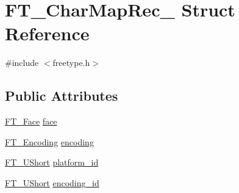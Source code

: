 \hypertarget{struct_f_t___char_map_rec__}{\section{F\-T\-\_\-\-Char\-Map\-Rec\-\_\- Struct Reference}
\label{struct_f_t___char_map_rec__}
}


{\ttfamily \#include $<$freetype.\-h$>$}

\subsection*{Public Attributes}
\begin{DoxyCompactItemize}
\item 
\hyperlink{freetype_8h_a7eba045ee20968354fa1bff0f69740fa}{F\-T\-\_\-\-Face} \hyperlink{struct_f_t___char_map_rec___a70a4e53e3f9818209916e5745c46dc28}{face}
\item 
\hyperlink{freetype_8h_a2c7f8d9834bb770d792cd8e0079f6835}{F\-T\-\_\-\-Encoding} \hyperlink{struct_f_t___char_map_rec___a88ee6f726ef11a8e6cc793d59ff5557e}{encoding}
\item 
\hyperlink{fttypes_8h_a937f6c17cf5ffd09086d8610c37b9f58}{F\-T\-\_\-\-U\-Short} \hyperlink{struct_f_t___char_map_rec___ae7f439996a8615698e780ce3c4f92457}{platform\-\_\-id}
\item 
\hyperlink{fttypes_8h_a937f6c17cf5ffd09086d8610c37b9f58}{F\-T\-\_\-\-U\-Short} \hyperlink{struct_f_t___char_map_rec___af10dd43eee8dc93e7d6191c663ae831a}{encoding\-\_\-id}
\end{DoxyCompactItemize}


